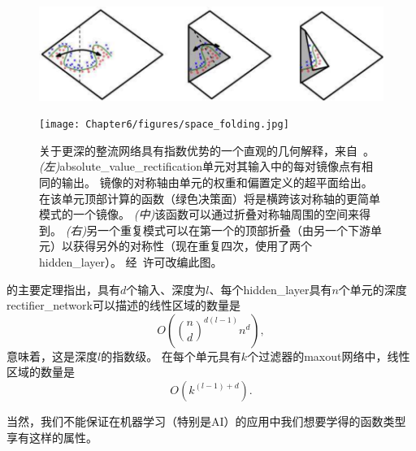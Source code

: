 \begin{figure}[!htb]
\ifOpenSource
\centerline{\includegraphics[scale=0.5]{images/47.png}}
\else
\centerline{\texttt{[image: Chapter6/figures/space\_folding.jpg]}}
\fi
\caption{ %
关于更深的整流网络具有指数优势的一个直观的几何解释，来自~\cite{Montufar-et-al-2014}。 
\emph{(左)}\gls{absolute_value_rectification}单元对其输入中的每对镜像点有相同的输出。
镜像的对称轴由单元的权重和偏置定义的超平面给出。 在该单元顶部计算的函数（绿色决策面）将是横跨该对称轴的更简单模式的一个镜像。 
\emph{(中)}该函数可以通过折叠对称轴周围的空间来得到。
\emph{(右)}另一个重复模式可以在第一个的顶部折叠（由另一个下游单元）以获得另外的对称性（现在重复四次，使用了两个\gls{hidden_layer}）。 
经~\cite{Montufar-et-al-2014}许可改编此图。}
\label{fig:chap6_space_folding}
\end{figure}


\cite{Montufar-et-al-2014}的主要定理指出，具有$d$个输入、深度为$l$、每个\gls{hidden_layer}具有$n$个单元的深度\gls{rectifier_network}可以描述的线性区域的数量是
\begin{equation}
O \left ( {n \choose d}^{d(l-1)} n^d \right ),
\end{equation}
意味着，这是深度$l$的指数级。
在每个单元具有$k$个过滤器的maxout网络中，线性区域的数量是
\begin{equation}
O \left ( k^{(l-1)+d} \right ).
\end{equation}


当然，我们不能保证在机器学习（特别是AI）的应用中我们想要学得的函数类型享有这样的属性。

